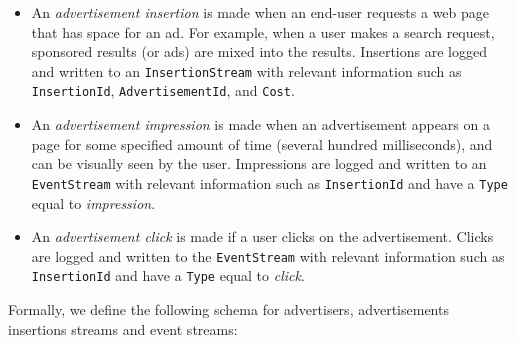 \documentclass[a4paper, 10pt, conference]{IEEEconf}
\begin{document}
\begin{itemize}

    \item An \textit{advertisement insertion} is made when an end-user requests a web page that has space for an ad. For example, when a user makes a search request, sponsored results (or ads) are mixed into the results.  Insertions are logged and written to an \texttt{InsertionStream} with relevant information such as \texttt{InsertionId}, \texttt{AdvertisementId}, and \texttt{Cost}.

    \item An \textit{advertisement impression} is made when an advertisement appears on a page for some specified amount of time (several hundred milliseconds), and can be visually seen by the user. Impressions are logged and written to an \texttt{EventStream} with relevant information such as \texttt{InsertionId} and have a \texttt{Type} equal to \textit{impression}.

    \item An \textit{advertisement click} is made if a user clicks on the advertisement. Clicks are logged and written to the \texttt{EventStream} with relevant information such as \texttt{InsertionId} and have a \texttt{Type} equal to \textit{click}.

\end{itemize}

Formally, we define the following schema for advertisers, advertisements insertions streams and event streams:

\begin{table}[h]
\caption[Table caption text]{Schema of relations and streams used in the ``Advertisement Statistics'' example. }
\label{table:schema}
\end{table}
\end{document}
